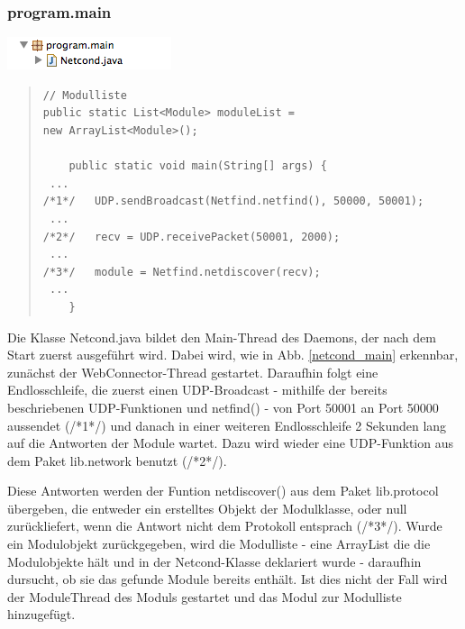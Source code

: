 \documentclass[a4paper,14pt,headsepline]{scrartcl}
\begin{document}
\newpage

\subsubsection*{program.main}

\includegraphics[width=0.24 \paperwidth]{./bilder/lib_main.png}

\begin{quote}
\begin{verbatim}
// Modulliste
public static List<Module> moduleList = 
new ArrayList<Module>();	
	
	public static void main(String[] args) {
 ...
/*1*/   UDP.sendBroadcast(Netfind.netfind(), 50000, 50001);
 ...
/*2*/   recv = UDP.receivePacket(50001, 2000);
 ...
/*3*/   module = Netfind.netdiscover(recv);
 ...
	}
\end{verbatim}
\end{quote} 

Die Klasse Netcond.java bildet den Main-Thread des Daemons, der nach dem Start zuerst ausgeführt wird. Dabei wird, wie in Abb. \ref{netcond_main} erkennbar, zunächst der WebConnector-Thread gestartet. Daraufhin folgt eine Endlosschleife, die zuerst einen UDP-Broadcast - mithilfe der bereits beschriebenen UDP-Funktionen und netfind() - von Port 50001 an Port 50000 aussendet (/*1*/) und danach in einer weiteren Endlosschleife 2 Sekunden lang auf die Antworten der Module wartet. Dazu wird wieder eine UDP-Funktion aus dem Paket lib.network benutzt (/*2*/). 

\newpage

Diese Antworten werden der Funtion netdiscover() aus dem Paket lib.protocol übergeben, die entweder ein erstelltes Objekt der Modulklasse, oder null \linebreak zurückliefert, wenn die Antwort nicht dem Protokoll entsprach (/*3*/). Wurde ein Modulobjekt zurückgegeben, wird die Modulliste - eine ArrayList die die Modulobjekte hält und in der Netcond-Klasse deklariert wurde - daraufhin dursucht, ob sie das gefunde Module bereits enthält. Ist dies nicht der Fall wird der ModuleThread des Moduls gestartet und das Modul zur Modulliste hinzugefügt. 
\end{document}
